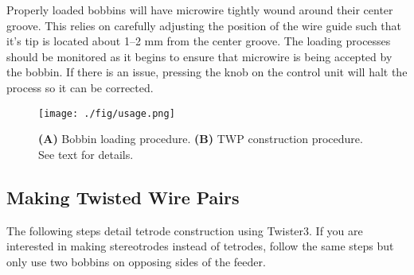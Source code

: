 \documentclass[11pt,a4paper]{article}
\begin{document}
Properly loaded bobbins will have microwire tightly wound around their center
groove. This relies on carefully adjusting the position of the wire guide such
that it's tip is located about 1--2 mm from the center groove. The loading
processes should be monitored as it begins to ensure that microwire is being
accepted by the bobbin. If there is an issue, pressing the knob on the
control unit will halt the process so it can be corrected.

\begin{figure}
\centering
\texttt{[image: ./fig/usage.png]}
\caption{\textbf{(A)} Bobbin loading procedure. \textbf{(B)} TWP construction
procedure. See text for details.}
\label{f:usage}
\end{figure}

\subsection{Making Twisted Wire Pairs}
The following steps detail tetrode construction using Twister3. If you are
interested in making stereotrodes instead of tetrodes, follow the same steps but
only use two bobbins on opposing sides of the feeder.
\end{document}
